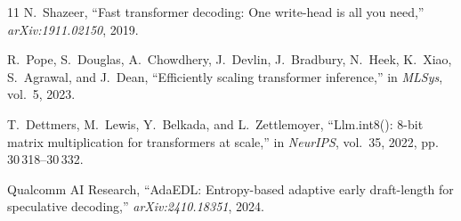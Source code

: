 \documentclass[10pt,journal,compsoc,twocolumn]{IEEEtran}
\begin{document}
\begin{thebibliography}{11}
N.~Shazeer, ``Fast transformer decoding: One write-head is all you need,'' \emph{arXiv:1911.02150}, 2019.

R.~Pope, S.~Douglas, A.~Chowdhery, J.~Devlin, J.~Bradbury, N.~Heek, K.~Xiao, S.~Agrawal, and J.~Dean, ``Efficiently scaling transformer inference,'' in \emph{MLSys}, vol.~5, 2023.

T.~Dettmers, M.~Lewis, Y.~Belkada, and L.~Zettlemoyer, ``Llm.int8(): 8-bit matrix multiplication for transformers at scale,'' in \emph{NeurIPS}, vol.~35, 2022, pp. 30\,318--30\,332.

Qualcomm AI Research, ``AdaEDL: Entropy-based adaptive early draft-length for speculative decoding,'' \emph{arXiv:2410.18351}, 2024.

\end{thebibliography}
\end{document}
